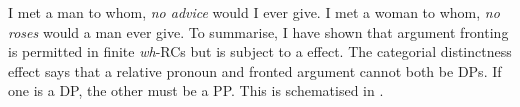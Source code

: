 \documentclass[output=paper]{langsci/langscibook}
\begin{document}
\ea\label{ex:2.51}
    \ea    I met a man to whom, \textit{no advice} would I ever give.
    \ex    I met a woman to whom, \textit{no roses} would a man ever give.
    \z
\ex\label{ex:2.52}
    \z
\z
To summarise, I have shown that argument fronting is permitted in finite
\emph{wh}{-\glspl{RC} but is subject to a  effect. The
categorial distinctness effect says that a relative pronoun and fronted
argument cannot both be} DPs. If one is a DP, the other must be a PP\@. This is
schematised in .%
%
%
%
\end{document}
